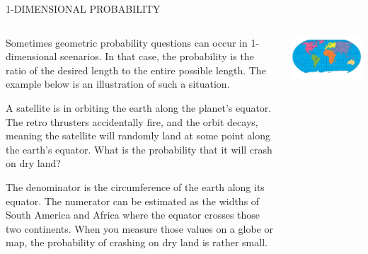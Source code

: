 \documentclass[9pt,aspectratio=169]{beamer}
\begin{document}
\begin{frame}{1-DIMENSIONAL PROBABILITY}
  \begin{columns}[T]
    \begin{column}{0.5\textwidth}
      Sometimes geometric probability questions can occur in 1-dimensional scenarios.  In that case, the probability is the ratio of the desired length to the entire possible length.  The example below is an illustration of such a situation.
      \begin{problem}
        A satellite is in orbiting the earth along the planet’s equator.  The retro thrusters accidentally fire, and the orbit decays, meaning the satellite will randomly land at some point along the earth’s equator.  What is the probability that it will crash on dry land?
      \end{problem}
      The denominator is the circumference of the earth along its equator.  The numerator can be estimated as the widths of South America and Africa where the equator crosses those two continents.  When you measure those values on a globe or map, the probability of crashing on dry land is rather small.
    \end{column}
    \begin{column}{0.5\textwidth}
      \includegraphics[width=\textwidth]{16 - Geometric Probability/map.png}
    \end{column}
  \end{columns}
\end{frame}
\end{document}
